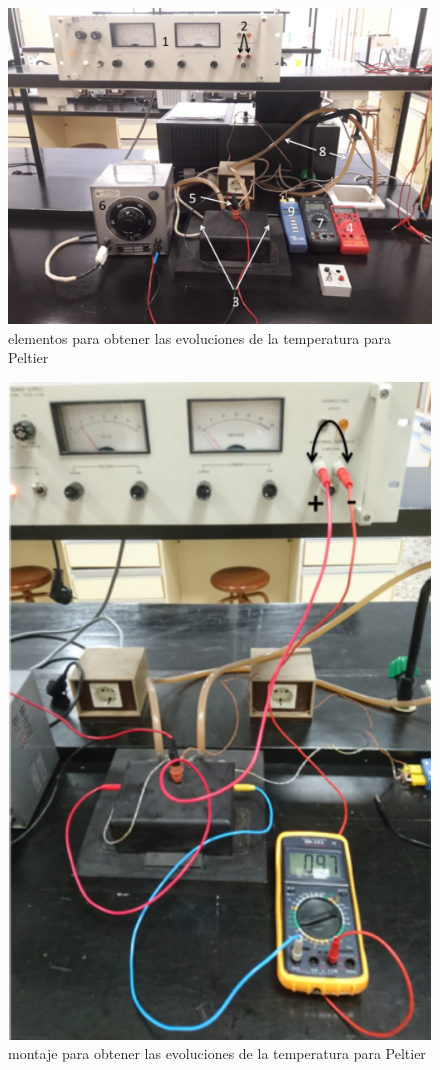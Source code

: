 \documentclass[12pt,a4paper]{article}
\begin{document}
\begin{figure}[h!] \centering
\includegraphics[scale=0.60]{foto7.png}
\caption{elementos para obtener las evoluciones de la temperatura para Peltier}
\label{Fig:foto7}
\end{figure}


\begin{figure}[h!] \centering
\includegraphics[scale=0.48]{foto8.png}
\caption{montaje para obtener las evoluciones de la temperatura para Peltier}
\label{Fig:foto8}
\end{figure}
\end{document}
